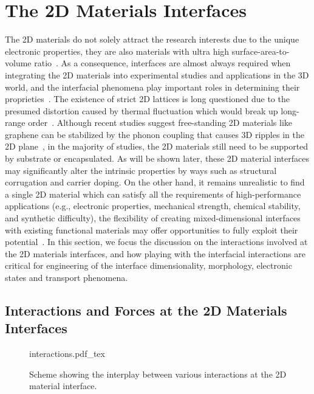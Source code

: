 \section{The 2D Materials Interfaces}
\label{sec:2d-mater-interf}
The 2D materials do not solely attract the research interests due to
the unique electronic properties, they are also materials with ultra
high surface-area-to-volume ratio~\autocite{Liu_2018_rev,Novoselov_2016_vdW}.
%
As a consequence,
interfaces are almost always required when integrating the 2D
materials into experimental studies and applications in the 3D world,
and the interfacial phenomena play important roles in determining
their proprieties~\autocite{Liu_2018_rev}.
% 
The existence of strict 2D lattices is long questioned
due to the presumed distortion caused by thermal fluctuation which
would break up long-range
order~\autocite{Peierls_1935_unstable,landau_2009_statistical_Phys_book}.
%
Although recent studies suggest free-standing 2D materials like
graphene can be stabilized by the phonon coupling that causes 3D
ripples in the 2D
plane~\autocite{Fasolino_2007_ripple,Brivio_2011_mos2_ripple}, in the
majority of studies, the 2D materials still need to be supported by
substrate or encapsulated.  As will be shown later, these 2D material
interfaces may significantly alter the intrinsic properties by ways
such as structural corrugation and carrier doping.
%
On the other hand, it remains unrealistic to find a single 2D material
which can satisfy all the requirements of high-performance
applications (e.g., electronic properties, mechanical strength,
chemical stability, and synthetic difficulty), the flexibility of
creating mixed-dimensional interfaces with existing functional
materials may offer opportunities to fully exploit their
potential~\autocite{Jariwala_2016_mixed_vdw_het}.
%
In this section, we focus the discussion on the
interactions involved at the 2D materials interfaces,
and how playing with the
interfacial interactions are critical for engineering of the
interface dimensionality, morphology, electronic states and transport
phenomena.

\subsection{Interactions and Forces at the 2D Materials Interfaces}
\label{sec:inter-forc-at}

\begin{figure}[!htbp]
  \centering
  {interactions.pdf_tex}
  \caption{\label{fig:intro-interactions} %
    Scheme showing the interplay between various interactions at the
    2D material interface.
  }
\end{figure}

